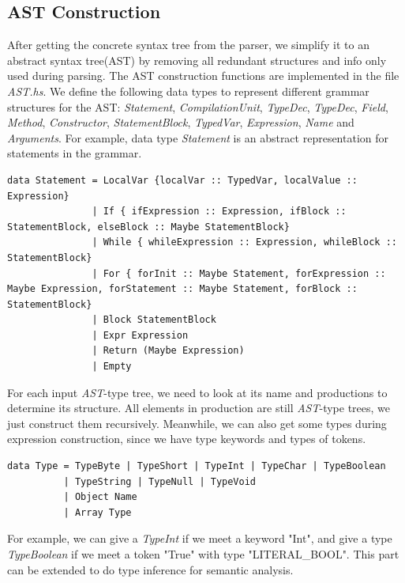 \documentclass[12pt,letterpaper]{article}
\begin{document}
\subsection{AST Construction}
After getting the concrete syntax tree from the parser, we simplify it to an abstract syntax tree(AST) by removing all redundant structures and info only used during parsing.
The AST construction functions are implemented in the file \emph{AST.hs}.
We define the following data types to represent different grammar structures for the AST: \emph{Statement}, \emph{CompilationUnit}, \emph{TypeDec}, \emph{TypeDec}, \emph{Field}, \emph{Method}, \emph{Constructor}, \emph{StatementBlock}, \emph{TypedVar}, \emph{Expression}, \emph{Name} and \emph{Arguments}.
For example, data type \emph{Statement} is an abstract representation for statements in the grammar.
\begin{lstlisting}
data Statement = LocalVar {localVar :: TypedVar, localValue :: Expression}
               | If { ifExpression :: Expression, ifBlock :: StatementBlock, elseBlock :: Maybe StatementBlock}
               | While { whileExpression :: Expression, whileBlock :: StatementBlock}
               | For { forInit :: Maybe Statement, forExpression :: Maybe Expression, forStatement :: Maybe Statement, forBlock :: StatementBlock}
               | Block StatementBlock
               | Expr Expression
               | Return (Maybe Expression)
               | Empty
\end{lstlisting}
For each input \emph{AST}-type tree, we need to look at its name and productions to determine its structure.
All elements in production are still \emph{AST}-type trees, we just construct them recursively.
Meanwhile, we can also get some types during expression construction, since we have type keywords and types of tokens.
\begin{lstlisting}
data Type = TypeByte | TypeShort | TypeInt | TypeChar | TypeBoolean
          | TypeString | TypeNull | TypeVoid
          | Object Name
          | Array Type
\end{lstlisting}
For example, we can give a \emph{TypeInt} if we meet a keyword "Int", and give a type \emph{TypeBoolean} if we meet a token "True" with type "LITERAL\_BOOL".
This part can be extended to do type inference for semantic analysis.
\end{document}

